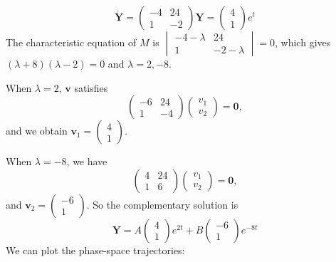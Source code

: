 \documentclass[a4paper]{article}
\begin{document}
    \begin{eg}
      \[
        \mathbf{\dot{Y}} = 
        \begin{pmatrix}
          -4 & 24\\
          1 & -2
        \end{pmatrix}
        \mathbf{Y} = 
        \begin{pmatrix}
          4\\1
        \end{pmatrix}e^t
      \]
      The characteristic equation of $M$ is $
      \begin{vmatrix}
        -4 - \lambda & 24\\
        1 & -2 - \lambda
      \end{vmatrix} = 0$, which gives $(\lambda + 8)(\lambda - 2) = 0$ and $\lambda = 2, -8$.

      When $\lambda = 2$, $\mathbf{v}$ satisfies
      \[
        \begin{pmatrix}
          -6 & 24\\
          1 & -4
        \end{pmatrix}
        \begin{pmatrix}
          v_1\\v_2
        \end{pmatrix} = \mathbf{0},
      \]
      and we obtain $\mathbf{v}_1 = 
      \begin{pmatrix}
        4\\1
      \end{pmatrix}$.

      When $\lambda = -8$, we have
      \[
        \begin{pmatrix}
          4 & 24\\
          1 & 6
        \end{pmatrix}
        \begin{pmatrix}
          v_1\\v_2
        \end{pmatrix} = \mathbf{0},
      \]
      and $\mathbf{v}_2 = 
      \begin{pmatrix}
        -6 \\1
      \end{pmatrix}$. So the complementary solution is 
      \[
        \mathbf{Y} = A
        \begin{pmatrix}
          4\\1
        \end{pmatrix}e^{2t} + B
        \begin{pmatrix}
          -6\\1
        \end{pmatrix}e^{-8t}
      \]
      We can plot the phase-space trajectories:


\end{eg}
\end{document}
